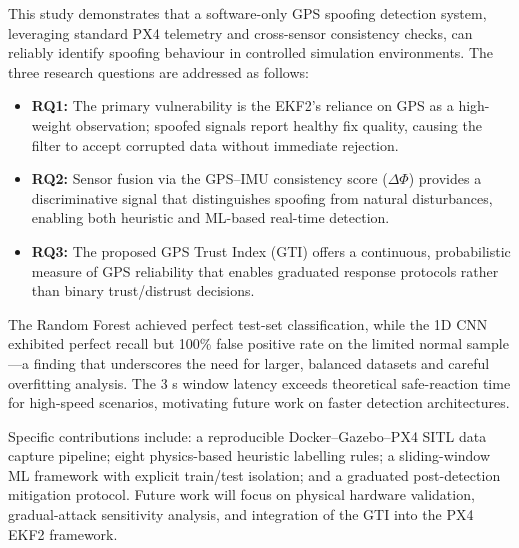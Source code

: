 \documentclass[11pt,a4paper]{article}
\begin{document}
This study demonstrates that a software-only GPS spoofing detection system, leveraging standard PX4 telemetry and cross-sensor consistency checks, can reliably identify spoofing behaviour in controlled simulation environments. The three research questions are addressed as follows:

\begin{itemize}
    \item \textbf{RQ1:} The primary vulnerability is the EKF2's reliance on GPS as a high-weight observation; spoofed signals report healthy fix quality, causing the filter to accept corrupted data without immediate rejection.
    \item \textbf{RQ2:} Sensor fusion via the GPS--IMU consistency score ($\Delta \Phi$) provides a discriminative signal that distinguishes spoofing from natural disturbances, enabling both heuristic and ML-based real-time detection.
    \item \textbf{RQ3:} The proposed GPS Trust Index (GTI) offers a continuous, probabilistic measure of GPS reliability that enables graduated response protocols rather than binary trust/distrust decisions.
\end{itemize}

The Random Forest achieved perfect test-set classification, while the 1D CNN exhibited perfect recall but 100\% false positive rate on the limited normal sample---a finding that underscores the need for larger, balanced datasets and careful overfitting analysis. The 3 s window latency exceeds theoretical safe-reaction time for high-speed scenarios, motivating future work on faster detection architectures.

Specific contributions include: a reproducible Docker--Gazebo--PX4 SITL data capture pipeline; eight physics-based heuristic labelling rules; a sliding-window ML framework with explicit train/test isolation; and a graduated post-detection mitigation protocol. Future work will focus on physical hardware validation, gradual-attack sensitivity analysis, and integration of the GTI into the PX4 EKF2 framework.
\end{document}
